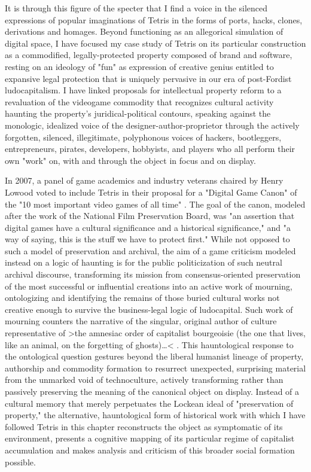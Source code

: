 It is through this figure of the specter that I find a voice in the silenced expressions of popular imaginations of Tetris in the forms of ports, hacks, clones, derivations and homages. Beyond functioning as an allegorical simulation of digital space, I have focused my case study of Tetris on its particular construction as a commodified, legally-protected property composed of brand and software, resting on an ideology of "fun" as expression of creative genius entitled to expansive legal protection that is uniquely pervasive in our era of post-Fordist ludocapitalism. I have linked proposals for intellectual property reform to a revaluation of the videogame commodity that recognizes cultural activity haunting the property's juridical-political contours, speaking against the monologic, idealized voice of the designer-author-proprietor through the actively forgotten, silenced, illegitimate, polyphonous voices of hackers, bootleggers, entrepreneurs, pirates, developers, hobbyists, and players who all perform their own "work" on, with and through the object in focus and on display.

In 2007, a panel of game academics and industry veterans chaired by Henry Lowood voted to include Tetris in their proposal for a "Digital Game Canon" of the "10 most important video games of all time" \autocite{Chaplin2008}. The goal of the canon, modeled after the work of the National Film Preservation Board, was "an assertion that digital games have a cultural significance and a historical significance," and "a way of saying, this is the stuff we have to protect first." While not opposed to such a model of preservation and archival, the aim of a game criticism modeled instead on a logic of haunting is for the public politicization of such neutral archival discourse, transforming its mission from consensus-oriented preservation of the most successful or influential creations into an active work of mourning, ontologizing and identifying the remains of those buried cultural works not creative enough to survive the business-legal logic of ludocapital. Such work of mourning counters the narrative of the singular, original author of culture representative of >the amnesiac order of capitalist bourgeoisie (the one that lives, like an animal, on the forgetting of ghosts)…< \autocite[139]{Derrida1994-ii}. This hauntological response to the ontological question gestures beyond the liberal humanist lineage of property, authorship and commodity formation to resurrect unexpected, surprising material from the unmarked void of technoculture, actively transforming rather than passively preserving the meaning of the canonical object on display. Instead of a cultural memory that merely perpetuates the Lockean ideal of "preservation of property," the alternative, hauntological form of historical work with which I have followed Tetris in this chapter reconstructs the object as symptomatic of its environment, presents a cognitive mapping of its particular regime of capitalist accumulation and makes analysis and criticism of this broader social formation possible.

